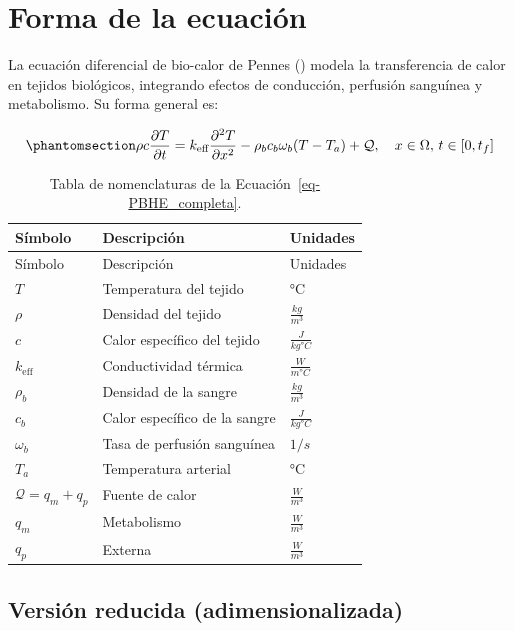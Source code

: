 \documentclass[
  spanish,
  us-letterpaper,
]{scrreprt}
\theoremstyle{plain}
\theoremstyle{definition}
\theoremstyle{remark}
\begin{document}
\chapter{Forma de la ecuación}\label{forma-de-la-ecuaciuxf3n}

La ecuación diferencial de bio-calor de Pennes
() modela la transferencia de calor en
tejidos biológicos, integrando efectos de conducción, perfusión
sanguínea y metabolismo. Su forma general es:

\begin{equation}\phantomsection\label{eq-PBHE_completa}{
\rho c \frac{\partial T}{\partial t} = k_{\text{eff}} \frac{\partial^{2} T}{\partial x^{2}} - \rho_b c_b \omega_b (T - T_a) + \mathcal{Q}, \quad x \in \Omega, \, t \in [0, t_f]
}\end{equation}

\begin{longtable}[]{@{}lll@{}}
\caption{Tabla de nomenclaturas de la
Ecuación~\ref{eq-PBHE_completa}.}\label{tbl-nomenclatura-PBHE_completa}\tabularnewline
\toprule\noalign{}
Símbolo & Descripción & Unidades \\
\midrule\noalign{}
\endfirsthead
\toprule\noalign{}
Símbolo & Descripción & Unidades \\
\midrule\noalign{}
\endhead
\bottomrule\noalign{}
\endlastfoot
\(T\) & Temperatura del tejido & °C \\
\(\rho\) & Densidad del tejido & \(\frac{kg}{m^3}\) \\
\(c\) & Calor específico del tejido & \(\frac{J}{kg °C}\) \\
\(k_{\text{eff}}\) & Conductividad térmica & \(\frac{W}{m °C}\) \\
\(\rho_b\) & Densidad de la sangre & \(\frac{kg}{m^3}\) \\
\(c_b\) & Calor específico de la sangre & \(\frac{J}{kg °C}\) \\
\(\omega_b\) & Tasa de perfusión sanguínea & \(1/s\) \\
\(T_a\) & Temperatura arterial & °C \\
\(\mathcal{Q} = q_m + q_p\) & Fuente de calor & \(\frac{W}{m^3}\) \\
\(q_m\) & Metabolismo & \(\frac{W}{m^3}\) \\
\(q_p\) & Externa & \(\frac{W}{m^3}\) \\
\end{longtable}

\section{Versión reducida
(adimensionalizada)}\label{versiuxf3n-reducida-adimensionalizada}
\end{document}
